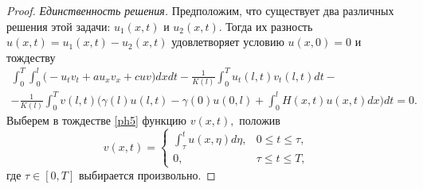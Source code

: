 \begin{proof}

{\it Единственность решения.} Предположим, что существует два различных решения
 этой задачи:  $u_1(x,t)$  и $u_2(x,t).$
Тогда их разность  $u(x,t)=u_1(x,t)-u_2(x,t)$ удовлетворяет условию  $u(x, 0)=0$ и тождеству
\begin{multline}
 \int _0^T \int _0^l \bigl(-u_tv_t+au_xv_x+cuv\bigr)dxdt-
\frac{1}{K(l)} \int _0^Tu_t(l,t)v_t(l,t)dt-
\\
 \label{ph5}
 -\frac{1}{K(l)}
 \int _0^Tv(l,t)\biggl(\gamma(l)u(l,t)-
\gamma(0)u(0,l)+ \int _0^lH(x,t)u(x,t)dx\biggr)dt =0.
\end{multline}
Выберем в тождестве \eqref{ph5} функцию $v(x,t),$ положив
$$
v(x,t)=\left\{
\begin{array}{cl}
\displaystyle \int _{\tau}^tu(x,\eta)d\eta, & 0\leq t\leq \tau,\\[2mm]
0, & \tau \leq t\leq T,
\end{array}\right.
$$
где $\tau \in [0, T]$ выбирается произвольно.


\end{proof}
